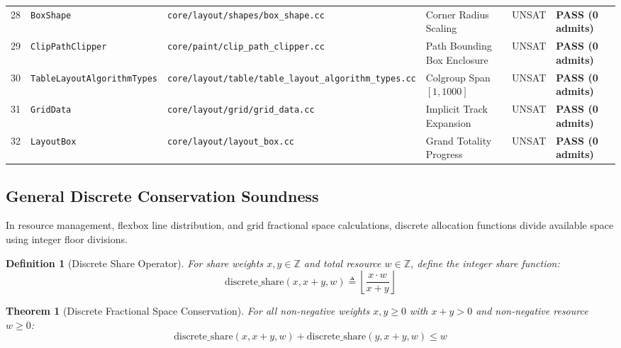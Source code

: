 \documentclass[10pt,journal,compsoc]{IEEEtran}
\newtheorem{theorem}{Theorem}
\newtheorem{definition}{Definition}
\begin{document}
\begin{table}[t]
\begin{tabular*}{\textwidth}{@{\extracolsep{\fill}}rlllll}
28 & \texttt{BoxShape} & \texttt{core/layout/shapes/box\_shape.cc} & Corner Radius Scaling & UNSAT & \textbf{PASS (0 admits)} \\
29 & \texttt{ClipPathClipper} & \texttt{core/paint/clip\_path\_clipper.cc} & Path Bounding Box Enclosure & UNSAT & \textbf{PASS (0 admits)} \\
30 & \texttt{TableLayoutAlgorithmTypes}& \texttt{core/layout/table/table\_layout\_algorithm\_types.cc} & Colgroup Span $[1, 1000]$ & UNSAT & \textbf{PASS (0 admits)} \\
31 & \texttt{GridData} & \texttt{core/layout/grid/grid\_data.cc} & Implicit Track Expansion & UNSAT & \textbf{PASS (0 admits)} \\
32 & \texttt{LayoutBox} & \texttt{core/layout/layout\_box.cc} & Grand Totality Progress & UNSAT & \textbf{PASS (0 admits)} \\
\bottomrule
\end{tabular*}
\end{table}

\subsection{General Discrete Conservation Soundness}
In resource management, flexbox line distribution, and grid fractional space calculations, discrete allocation functions divide available space using integer floor divisions.

\begin{definition}[Discrete Share Operator]
For share weights $x, y \in \mathbb{Z}$ and total resource $w \in \mathbb{Z}$, define the integer share function:
\begin{equation}
\text{discrete\_share}(x, x+y, w) \triangleq \left\lfloor \frac{x \cdot w}{x + y} \right\rfloor
\end{equation}
\end{definition}

\begin{theorem}[Discrete Fractional Space Conservation]
For all non-negative weights $x, y \ge 0$ with $x + y > 0$ and non-negative resource $w \ge 0$:
\begin{equation}
\text{discrete\_share}(x, x+y, w) + \text{discrete\_share}(y, x+y, w) \le w
\end{equation}
\end{theorem}
\end{document}
